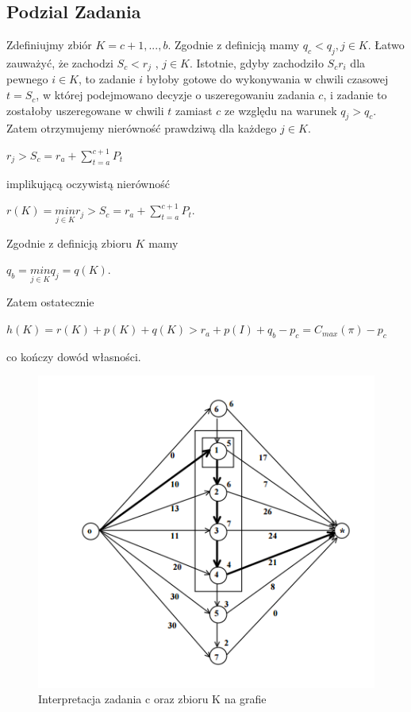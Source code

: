 \documentclass[11pt]{article}
\begin{document}
\subsection{Podzial Zadania}
Zdefiniujmy zbiór $K = {c + 1, . . . , b}$. Zgodnie z definicją mamy $q_c < q_j , j \in K$. Łatwo zauważyć, że zachodzi $S_c < r_j$ , $j \in K$. Istotnie, gdyby zachodziło $S_c r_i$ dla pewnego $i \in K$, to zadanie $i$ byłoby gotowe do wykonywania w chwili czasowej $t = S_c$, w której podejmowano decyzje o uszeregowaniu zadania $c$, i zadanie to zostałoby uszeregowane w chwili $t$ zamiast $c$ ze względu na warunek $q_j > q_c$. Zatem otrzymujemy nierówność prawdziwą dla każdego $j \in K$.
 \begin{center}
 $r_j > S_c = r_a + \sum^{c+1}_{t=a}P_t$\\
 \end{center}
 implikującą oczywistą nierówność 
 \begin{center}
$r(K) = \underset{j \in K}{min} r_j > S_c = r_a +\sum^{c+1}_{t=a}P_t$. \\
\end{center}
Zgodnie z definicją zbioru $K$ mamy 
\begin{center}
$q_b = \underset{j \in K}{min} q_j = q(K)$.\\
\end{center}
Zatem ostatecznie
\begin{center}
 $h(K) = r(K) + p(K) + q(K) > r_a + p(I) + q_b - p_c = C_{max}(\pi) - p_c$\\
\end{center}
co kończy dowód własności. 

\begin{figure}[!ht]
\centering
\includegraphics[scale=0.7]{wyk_2}
\caption{Interpretacja zadania c oraz zbioru K na grafie}
\end{figure}
\end{document}
